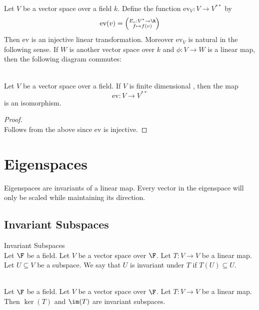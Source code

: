 \documentclass[a4paper]{article}
\begin{document}
\begin{prp}{}{} Let $V$ be a vector space over a field $k$. Define the function $\text{ev}_V:V\to V^{\ast\ast}$ by $$\text{ev}(v)=\left(\substack{E_v:V^\ast\to\R\\f\mapsto f(v)}\right)$$ Then $\text{ev}$ is an injective linear transformation. Moreover $\text{ev}_V$ is natural in the following sense. If $W$ is another vector space over $k$ and $\phi:V\to W$ is a linear map, then the following diagram commutes: \\
\\
\end{prp}

\begin{crl}{}{}
Let $V$ be a vector space over a field. If $V$ is finite dimensional , then the map $$\text{ev}:V\to V^{\ast\ast}$$ is an isomorphism. 
\begin{proof}\\
Follows from the above since $\text{ev}$ is injective. 
\end{proof}
\end{crl}

\pagebreak
\section{Eigenspaces}
Eigenspaces are invariants of a linear map. Every vector in the eigenspace will only be scaled while maintaining its direction. 

\subsection{Invariant Subspaces}
\begin{defn}{Invariant Subspaces}{}\\
Let $\F$ be a field. Let $V$ be a vector space over $\F$. Let $T:V\to V$ be a linear map. Let $U\subseteq V$ be a subspace. We say that $U$ is invariant under $T$ if $T(U)\subseteq U$. 
\end{defn}

\begin{lmm}{}{}\\
Let $\F$ be a field. Let $V$ be a vector space over $\F$. Let $T:V\to V$ be a linear map. Then $\ker(T)$ and $\im(T)$ are invariant subspaces. 
\end{lmm}
\end{document}
